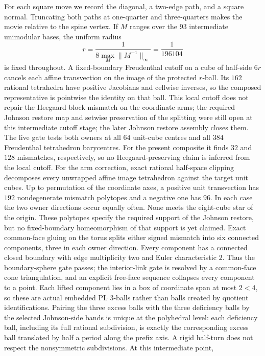 \documentclass[11pt]{amsart}
\theoremstyle{definition}
\theoremstyle{remark}
\begin{document}
For each square move we record the diagonal, a two-edge path, and a square
normal.  Truncating both paths at one-quarter and three-quarters makes the
movie relative to the spine vertex.  If $M$ ranges over the $93$ intermediate
unimodular bases, the uniform radius
\[
r=\frac{1}{8\max_M\lVert M^{-1}\rVert_\infty}=\frac1{196104}
\]
is fixed throughout.  A fixed-boundary Freudenthal cutoff on a cube of
half-side $6r$ cancels each affine transvection on the image of the
protected $r$-ball.  Its $162$ rational tetrahedra have positive
Jacobians and cellwise inverses, so the composed representative is pointwise
the identity on that ball.  This local cutoff does not repair the Heegaard
block mismatch on the coordinate arms; the required Johnson restore map and
setwise preservation of the splitting were still open at this intermediate
cutoff stage; the later Johnson restore assembly closes them.
The live gate tests both owners at all $64$ unit-cube centres and all $384$
Freudenthal tetrahedron barycentres.  For the present composite it finds $32$
and $128$ mismatches, respectively, so no Heegaard-preserving claim is
inferred from the local cutoff.
For the arm correction, exact rational half-space clipping decomposes every
unwrapped affine image tetrahedron against the target unit cubes.  Up to
permutation of the coordinate axes, a positive unit transvection has $192$
nondegenerate mismatch polytopes and a negative one has $96$.  In each case
the two owner directions occur equally often.  None meets the eight-cube
star of the origin.  These polytopes specify the required support of the
Johnson restore, but no fixed-boundary homeomorphism of that support is yet
claimed.  Exact common-face gluing on the torus splits either signed mismatch
into six connected components, three in each owner direction.  Every component
has a connected closed boundary with edge multiplicity two and Euler
characteristic $2$.  Thus the boundary-sphere gate passes; the interior-link
gate is resolved by a common-face cone triangulation, and an explicit
free-face sequence collapses every component to a point.  Each lifted
component lies in a box of coordinate span at most $2<4$, so these are actual
embedded PL $3$-balls rather than balls created by quotient identifications.
Pairing the three excess balls with the three deficiency balls by the selected
Johnson-side bands is unique at the polyhedral level: each deficiency ball,
including its full rational subdivision, is exactly the corresponding excess
ball translated by half a period along the prefix axis.  A rigid half-turn
does not respect the nonsymmetric subdivisions.  At this intermediate point,
\end{document}
